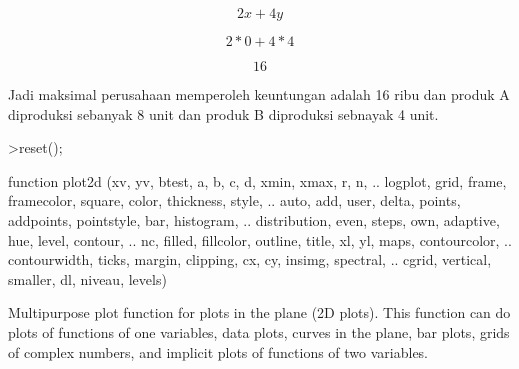\documentclass{article}
\begin{document}
\begin{eulernotebook}
\begin{eulercomment}
\begin{eulercomment}
\begin{eulercomment}
\begin{eulercomment}
\begin{eulercomment}
\end{eulercomment}
\begin{eulerformula}
\[
2x+4y
\]
\end{eulerformula}
\begin{eulerformula}
\[
2*0+4*4
\]
\end{eulerformula}
\begin{eulerformula}
\[
16
\]
\end{eulerformula}
\begin{eulercomment}
Jadi maksimal perusahaan memperoleh keuntungan adalah 16 ribu dan
produk A diproduksi sebanyak 8 unit dan produk B diproduksi sebnayak 4
unit.
\end{eulercomment}
\begin{eulerprompt}
>reset();
\end{eulerprompt}
\begin{eulercomment}
\end{eulercomment}
\begin{eulerttcomment}
  function plot2d (xv, yv, btest, a, b, c, d, xmin, xmax, r, n,  ..
  logplot, grid, frame, framecolor, square, color, thickness, style, ..
  auto, add, user, delta, points, addpoints, pointstyle, bar, histogram,  ..
  distribution, even, steps, own, adaptive, hue, level, contour,  ..
  nc, filled, fillcolor, outline, title, xl, yl, maps, contourcolor, ..
  contourwidth, ticks, margin, clipping, cx, cy, insimg, spectral,  ..
  cgrid, vertical, smaller, dl, niveau, levels)
\end{eulerttcomment}
\begin{eulercomment}
Multipurpose plot function for plots in the plane (2D plots). This function can do
plots of functions of one variables, data plots, curves in the plane, bar plots, grids
of complex numbers, and implicit plots of functions of two variables.


\end{eulercomment}
\end{eulercomment}
\end{eulercomment}
\end{eulercomment}
\end{eulercomment}
\end{eulernotebook}
\end{document}

